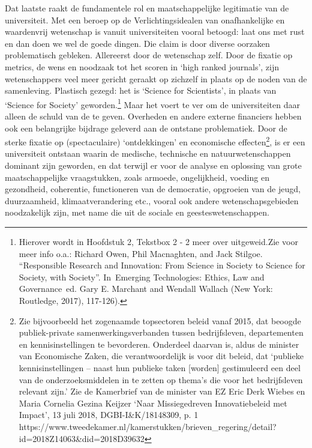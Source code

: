 \documentclass[empirical, authordate, ]{new-jote-article}
\begin{document}
	Dat laatste raakt de fundamentele rol en maatschappelijke legitimatie van de universiteit. Met een beroep op de Verlichtingsidealen van onafhankelijke en waardenvrij wetenschap is vanuit universiteiten vooral betoogd: laat ons met rust en dan doen we wel de goede dingen. Die claim is door diverse oorzaken problematisch gebleken. Allereerst door de wetenschap zelf. Door de fixatie op metrics, de wens en noodzaak tot het scoren in ‘high ranked journals', zijn wetenschappers veel meer gericht geraakt op zichzelf in plaats op de noden van de samenleving. Plastisch gezegd: het is ‘Science for Scientists', in plaats van ‘Science for Society' geworden.\footnote{Hierover wordt in Hoofdstuk 2, Tekstbox 2 - 2 meer over uitgeweid.Zie voor meer info o.a.: Richard Owen, Phil Macnaghten, and Jack Stilgoe. “Responsible Research and Innovation: From Science in Society to Science for Society, with Society”. In Emerging Technologies: Ethics, Law and Governance ed. Gary E. Marchant and Wendall Wallach (New York: Routledge, 2017), 117-126). } Maar het voert te ver om de universiteiten daar alleen de schuld van de te geven. Overheden en andere externe financiers hebben ook een belangrijke bijdrage geleverd aan de ontstane problematiek. Door de sterke fixatie op (spectaculaire) ‘ontdekkingen' en economische effecten\footnote{Zie bijvoorbeeld het zogenaamde topsectoren beleid vanaf 2015, dat beoogde publiek-private samenwerkingsverbanden tussen bedrijfsleven, departementen en kennisinstellingen te bevorderen. Onderdeel daarvan is, aldus de minister van Economische Zaken, die verantwoordelijk is voor dit beleid, dat ‘publieke kennisinstellingen -- naast hun publieke taken [worden] gestimuleerd een deel van de onderzoeksmiddelen in te zetten op thema's die voor het bedrijfsleven relevant zijn.' Zie de Kamerbrief van de minister van EZ Eric Derk Wiebes en Maria Cornelia Gezina Keijzer ‘Naar Missiegedreven Innovatiebeleid met Impact', 13 juli 2018, DGBI-I\&K/18148309, p. 1 https://www.tweedekamer.nl/kamerstukken/brieven\_regering/detail?id=2018Z14063\&did=2018D39632}, is er een universiteit ontstaan waarin de medische, technische en natuurwetenschappen dominant zijn geworden, en dat terwijl er voor de analyse en oplossing van grote maatschappelijke vraagstukken, zoals armoede, ongelijkheid, voeding en gezondheid, coherentie, functioneren van de democratie, opgroeien van de jeugd, duurzaamheid, klimaatverandering etc., vooral ook andere wetenschapsgebieden noodzakelijk zijn, met name die uit de sociale en geesteswetenschappen.
\end{document}
